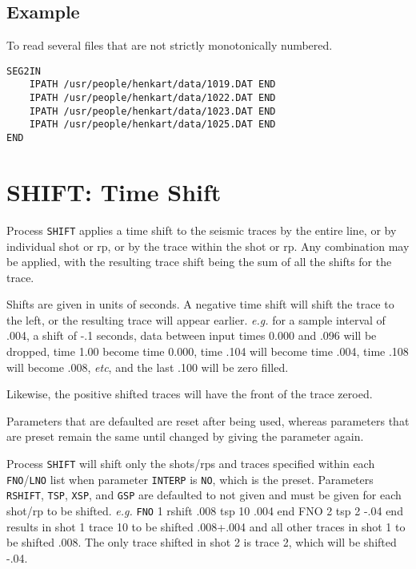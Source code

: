\subsection{Example}

To read several files that are not strictly monotonically numbered.

\begin{verbatim}
SEG2IN
    IPATH /usr/people/henkart/data/1019.DAT END
    IPATH /usr/people/henkart/data/1022.DAT END
    IPATH /usr/people/henkart/data/1023.DAT END
    IPATH /usr/people/henkart/data/1025.DAT END
END
\end{verbatim}

\section{SHIFT: Time Shift}
\label{cmd_shift}

Process \texttt{SHIFT} applies a time shift to the seismic traces by the entire
line, or by individual \gls{shot} or \gls{rp}, or by the trace within the \gls{shot} or
\gls{rp}.  Any combination may be applied, with the resulting trace shift being
the sum of all the shifts for the trace.

Shifts are given in units of seconds.  A negative time shift will shift
the trace to the left, or the resulting trace will appear earlier.
\textit{e.g.} for a sample interval of .004, a shift of -.1 seconds, data between
input times 0.000 and .096 will be dropped, time 1.00 become time 0.000,
time .104 will become time .004, time .108 will become .008, \textit{etc},
and the last .100 will be zero filled.

Likewise, the positive shifted traces will have the front of the trace
zeroed.

Parameters that are defaulted are reset after being used, whereas
parameters that are preset remain the same until changed by giving the
parameter again.

Process \texttt{SHIFT} will shift only the \glspl{shot}/\glspl{rp} and traces specified within
each \texttt{FNO}/\texttt{LNO} list when parameter \texttt{INTERP} is \texttt{NO}, which is the preset.
Parameters \texttt{RSHIFT}, \texttt{TSP}, \texttt{XSP}, and \texttt{GSP} are defaulted to not given and must
be given for each \gls{shot}/\gls{rp} to be shifted.
            \textit{e.g.} \texttt{FNO} 1 rshift .008 tsp 10 .004 end
                 FNO 2 tsp 2 -.04 end
results in \gls{shot} 1 trace 10 to be shifted .008+.004 and all other traces
in \gls{shot} 1 to be shifted .008.  The only trace shifted in \gls{shot} 2 is trace
2, which will be shifted -.04.


